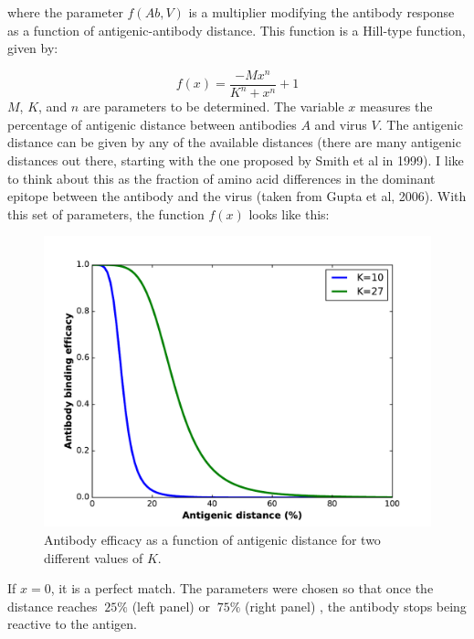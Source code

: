 \documentclass[11pt]{article}
\begin{document}
where the parameter $f(Ab, V)$ is a multiplier modifying the antibody response as a function of antigenic-antibody distance. This function is  a Hill-type function, given by:

$$ f(x) = \frac{-M x^n}{K^n + x^n} + 1$$
$M$, $K$, and $n$ are parameters to be determined.
The variable $x$ measures the percentage of antigenic distance between antibodies $A$ and virus $V$. The antigenic distance can be given by any of the available distances (there are many antigenic distances out there, starting with the one proposed by Smith et al in 1999). I like to think about this as the  fraction of amino acid differences in the dominant epitope between the antibody and the virus (taken from Gupta et al, 2006). With this set of parameters, the function $f(x)$ looks like this:

\begin{figure}[htbp]
\begin{center}
\includegraphics[scale=0.5]{functionAntigenicDistance.pdf}
\caption{Antibody efficacy as a function of antigenic distance for two different values of $K$.}
\label{figantigenicDistance}
\end{center}
\end{figure}

If $x=0$, it is a perfect match. The parameters were chosen so that once the distance reaches $~25\%$ (left panel) or $~75\%$ (right panel) , the antibody stops being  reactive to the antigen.
\\
\end{document}
